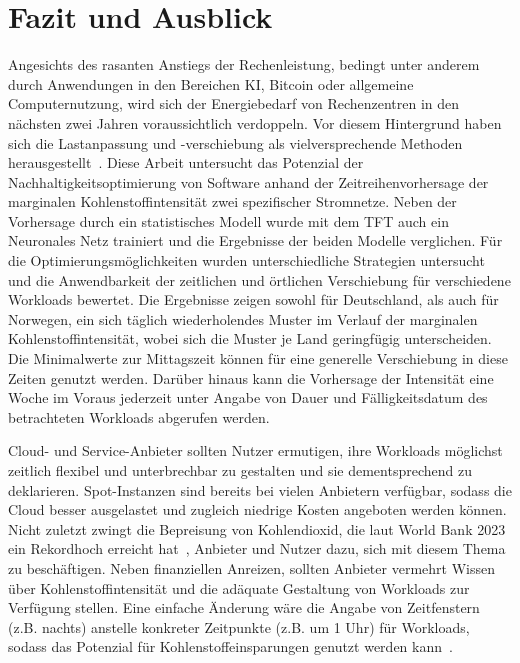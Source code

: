 \chapter{Fazit und Ausblick}
Angesichts des rasanten Anstiegs der Rechenleistung, bedingt unter anderem durch Anwendungen in den Bereichen \ac{KI}, Bitcoin oder allgemeine Computernutzung, wird sich der Energiebedarf von Rechenzentren in den nächsten zwei Jahren voraussichtlich verdoppeln.
Vor diesem Hintergrund haben sich die Lastanpassung und -verschiebung als vielversprechende Methoden herausgestellt~\cite{WattTime.12.3.2024}.
Diese Arbeit untersucht das Potenzial der Nachhaltigkeitsoptimierung von Software anhand der Zeitreihenvorhersage der marginalen Kohlenstoffintensität zwei spezifischer Stromnetze.
Neben der Vorhersage durch ein statistisches Modell wurde mit dem \ac{TFT} auch ein Neuronales Netz trainiert und die Ergebnisse der beiden Modelle verglichen.
Für die Optimierungsmöglichkeiten wurden unterschiedliche Strategien untersucht und die Anwendbarkeit der zeitlichen und örtlichen Verschiebung für verschiedene Workloads bewertet.
Die Ergebnisse zeigen sowohl für Deutschland, als auch für Norwegen, ein sich täglich wiederholendes Muster im Verlauf der marginalen Kohlenstoffintensität, wobei sich die Muster je Land geringfügig unterscheiden.
Die Minimalwerte zur Mittagszeit können für eine generelle Verschiebung in diese Zeiten genutzt werden.
Darüber hinaus kann die Vorhersage der Intensität eine Woche im Voraus jederzeit unter Angabe von Dauer und Fälligkeitsdatum des betrachteten Workloads abgerufen werden.

Cloud- und Service-Anbieter sollten Nutzer ermutigen, ihre Workloads möglichst zeitlich flexibel und unterbrechbar zu gestalten und sie dementsprechend zu deklarieren.
Spot-Instanzen sind bereits bei vielen Anbietern verfügbar, sodass die Cloud besser ausgelastet und zugleich niedrige Kosten angeboten werden können.
Nicht zuletzt zwingt die Bepreisung von Kohlendioxid, die laut World Bank 2023 ein Rekordhoch erreicht hat~\cite{WorldBank.2023}, Anbieter und Nutzer dazu, sich mit diesem Thema zu beschäftigen.
Neben finanziellen Anreizen, sollten Anbieter vermehrt Wissen über Kohlenstoffintensität und die adäquate Gestaltung von Workloads zur Verfügung stellen.
Eine einfache Änderung wäre die Angabe von Zeitfenstern (z.B. nachts) anstelle konkreter Zeitpunkte (z.B. um 1 Uhr) für Workloads, sodass das Potenzial für Kohlenstoffeinsparungen genutzt werden kann~\cite{Wiesner.2021}.

